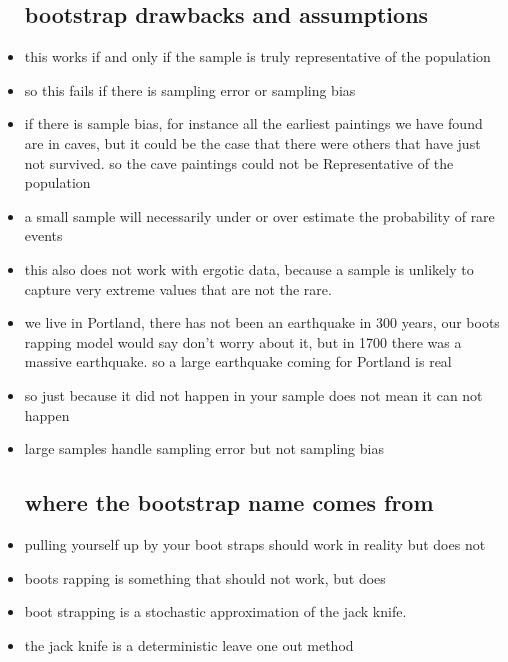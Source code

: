 \documentclass{article}
\begin{document}
\begin{itemize}
\subsection{bootstrap drawbacks and assumptions}
\item this works if and only if the sample is truly representative of the population
\item so this fails if there is sampling error or sampling bias
\item if there is sample bias, for instance all the earliest paintings  we have found are in caves, but it could be the case that there were others that have just not survived. so the cave paintings could not be Representative of the population
\item a small sample will necessarily under or over estimate the probability of rare events
\item this also does not work with ergotic data, because a sample is unlikely to capture very extreme values that are not the rare. 
\item we live in Portland, there has not been an earthquake in 300 years, our boots rapping model would say don't worry about it, but in 1700 there was a massive earthquake. so a large earthquake coming for Portland is real 
\item so just because it did not happen in your sample does not mean it can not happen 
\item large samples handle sampling error but not sampling bias 
\subsection{where the bootstrap name comes from}
\item pulling yourself up by your boot straps should work in reality but does not 
\item boots rapping is something that should not work, but does
\item boot strapping is a stochastic approximation of the jack knife. 
\item the jack knife is a deterministic leave one out method 

\end{itemize}
\end{document}
